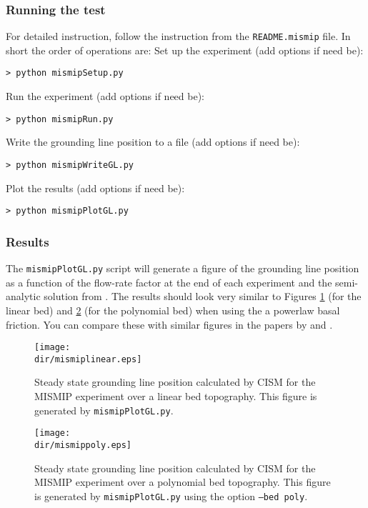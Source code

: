\subsubsection{Running the test}
For detailed instruction, follow the instruction from the \texttt{README.mismip} file. In short the order of operations are:
Set up the experiment (add options if need be):

\texttt{> python mismipSetup.py}

\noindent
Run the experiment (add options if need be):

\texttt{> python mismipRun.py}

\noindent
Write the grounding line position to a file (add options if need be):

\texttt{> python mismipWriteGL.py}

\noindent
Plot the results (add options if need be):

\texttt{> python mismipPlotGL.py}


\subsubsection{Results}
The \texttt{mismipPlotGL.py} script will generate a figure of the grounding line position as a function of the flow-rate factor at the end of each experiment and the semi-analytic solution from \citet{Schoof2007}.
The results should look very similar to Figures \ref{fig:mismiplinear} (for the linear bed) and \ref{fig:mismippoly} (for the polynomial bed) when using the a powerlaw basal friction. You can compare these with similar figures in the papers by  \citet{Pattyn2012} and \citet{Leguy2014}.

\begin{figure}[H]
	\centering
	\texttt{[image: \\dir/mismiplinear.eps]}
	\caption{Steady state grounding line position calculated by CISM for the MISMIP experiment over a linear bed topography. This figure is generated by \texttt{mismipPlotGL.py}.}
	\label{fig:mismiplinear}
\end{figure}

\begin{figure}[H]
	\centering
	\texttt{[image: \\dir/mismippoly.eps]}
	\caption{Steady state grounding line position calculated by CISM for the MISMIP experiment over a polynomial bed topography. This figure is generated by \texttt{mismipPlotGL.py} using the option \texttt{--bed poly}.}
	\label{fig:mismippoly}
\end{figure}


